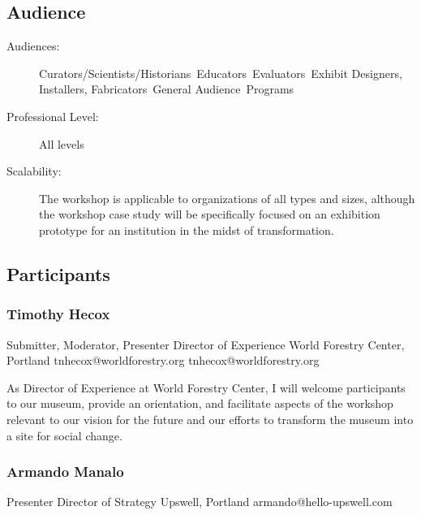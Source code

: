 \documentclass{report}
\begin{document}
              \subsection*{Audience}
                \begin{description}
                  \item [Audiences:]Curators/Scientists/Historians~Educators~Evaluators~Exhibit Designers, Installers, Fabricators~General Audience~Programs~
                  \item[Professional Level:]All levels~
                \item[Scalability:] The workshop is applicable to organizations of all types and sizes, although the workshop case study will be specifically focused on an exhibition prototype for an institution in the midst of transformation.

							
              \end{description}
            \subsection*{Participants}
              \subsubsection*{ Timothy Hecox }
              Submitter, Moderator, Presenter\newline
              Director of Experience \newline
              World Forestry Center, Portland
              \newline
              tnhecox@worldforestry.org\newline
              tnhecox@worldforestry.org\newline

              As Director of Experience at World Forestry Center, I will welcome participants to our museum, provide an orientation, and facilitate aspects of the workshop relevant to our vision for the future and our efforts to transform the museum into a site for social change.\newline


              

              
                \subsubsection*{ Armando Manalo }
                Presenter\newline
                Director of Strategy\newline
                Upswell, Portland
                \newline
                armando@hello-upswell.com\newline
                
\end{document}
